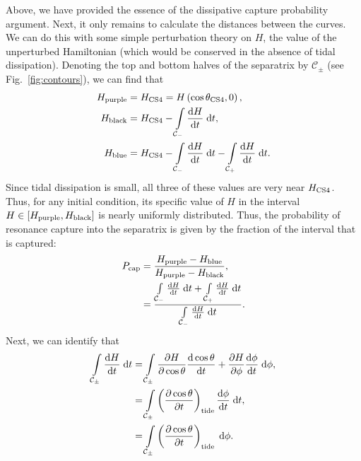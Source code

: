 \documentclass[11pt,
        usenames, %
        dvipsnames %
    ]{article}
\newcommand*{\rd}[2]{\frac{\mathrm{d}#1}{\mathrm{d}#2}}
\newcommand*{\pd}[2]{\frac{\partial#1}{\partial#2}}
\newcommand*{\p}[1]{\left(#1\right)}
\newcommand*{\s}[1]{\left[#1\right]}
\begin{document}
Above, we have provided the essence of the dissipative capture probability
argument. Next, it only remains to calculate the distances between the curves.
We can do this with some simple perturbation theory on $H$, the value of the
unperturbed Hamiltonian (which would be conserved in the absence of tidal
dissipation). Denoting the top and bottom halves of the separatrix by
$\mathcal{C}_{\pm}$ (see Fig.~\ref{fig:contours}), we can find that
\begin{align}
    H_{\rm purple} &= H_{\rm CS4} = H\p{\cos \theta_{\rm CS4}, 0},\\
    H_{\rm black} &= H_{\rm CS4}
        - \int\limits_{\mathcal{C}_-}\rd{H}{t}\;\mathrm{d}t,\\
    H_{\rm blue} &= H_{\rm CS4}
        - \int\limits_{\mathcal{C}_-}\rd{H}{t}\;\mathrm{d}t
        - \int\limits_{\mathcal{C}_+}\rd{H}{t}\;\mathrm{d}t.
\end{align}
Since tidal dissipation is small, all three of these values are very near
$H_{\rm CS4}$. Thus, for any initial condition, its specific value of $H$ in the
interval $H \in \s{H_{\rm purple}, H_{\rm black}}$ is nearly uniformly
distributed. Thus, the probability of resonance capture into the separatrix is
given by the fraction of the interval that is captured:
\begin{align}
    P_{\rm cap} &= \frac{H_{\rm purple} - H_{\rm blue}}{
        H_{\rm purple} - H_{\rm black}},\\
        &= \frac{
            \int\limits_{\mathcal{C}_-}\rd{H}{t}\;\mathrm{d}t +
            \int\limits_{\mathcal{C}_+}\rd{H}{t}\;\mathrm{d}t
        }{\int\limits_{\mathcal{C}_-}\rd{H}{t}\;\mathrm{d}t}.
\end{align}
Next, we can identify that
\begin{align}
    \int\limits_{\mathcal{C}_{\pm}}
            \rd{H}{t}\;\mathrm{d}t
        &= \int\limits_{\mathcal{C}_{\pm}}
            \pd{H}{\cos\theta}\rd{\cos\theta}{t}
            + \pd{H}{\phi}\rd{\phi}{t}\;\mathrm{d}\phi,\\
        &= \int\limits_{\mathcal{C}_{\pm}}
            \p{\pd{\cos\theta}{t}}_{\rm tide}\rd{\phi}{t}\;\mathrm{d}t,\\
        &= \int\limits_{\mathcal{C}_{\pm}}
            \p{\pd{\cos\theta}{t}}_{\rm tide}\;\mathrm{d}\phi.
\end{align}
\end{document}
